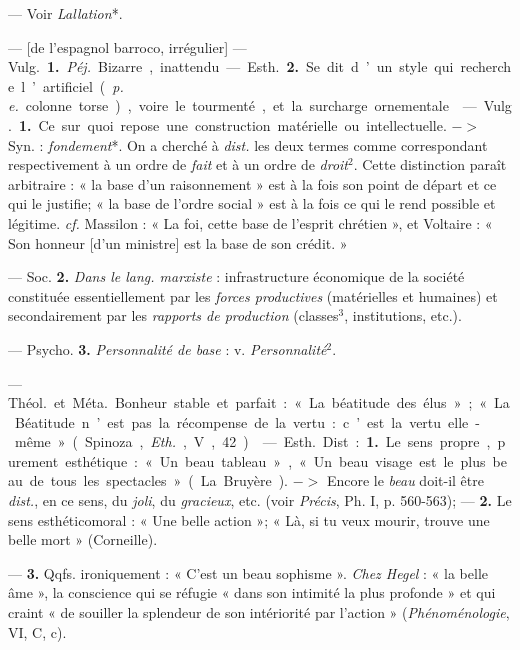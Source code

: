 
	\begin{itemize}[leftmargin=1cm, label=, itemsep=1pt]

 — Voir {\it Lallation}*.

 — [de l'espagnol {\it }barroco, irrégulier] — \si{Vulg.} {\bf 1.} {\it Péj.} Bizarre,
inattendu. — \si{Esth.} {\bf 2.} Se dit d’un
style qui recherche l’artificiel ({\it p. e.}
colonne torse), voire le tourmenté,
et la surcharge ornementale.

 — \si{Vulg.} {\bf 1.} Ce sur quoi repose
une construction matérielle ou intellectuelle. $->$ Syn. : {\it fondement}*. On
a cherché à {\it dist.} les deux termes
comme correspondant respectivement à un ordre de {\it fait} et à un ordre
de {\it droit}$^2$. Cette distinction paraît
arbitraire : « la base d’un raisonnement » est à la fois son point de
départ et ce qui le justifie; « la base
de l’ordre social » est à la fois ce qui
le rend possible et légitime. {\it cf.}  Massilon : « La foi, cette base de l'esprit
chrétien », et Voltaire : « Son honneur [d'un ministre] est la base de
son crédit. »

— Soc. {\bf 2.} {\it Dans le lang. marxiste} :
infrastructure économique de la
société constituée essentiellement
par les {\it forces productives} (matérielles
et humaines) et secondairement par
les {\it rapports de production} (classes$^3$,
institutions, etc.).

— Psycho. {\bf 3.} {\it Personnalité de base} :
v. {\it Personnalité}$^2$.

 — \si{Théol.} et \si{Méta.} Bonheur
stable et parfait : « La béatitude des
élus »; « La Béatitude n’est pas la
récompense de la vertu : c’est la vertu elle-même » (Spinoza, {\it Eth.}, V, 42).

 — \si{Esth.} Dist. : {\bf 1.} Le sens propre,
purement esthétique : « Un beau
tableau », « Un beau visage est le
plus beau de tous les spectacles » (La
Bruyère). $->$ Encore le {\it beau} doit-il
être {\it dist.}, en ce sens, du {\it joli}, du
{\it gracieux}, etc. (voir {\it Précis}, Ph. I,
p. 560-563); — {\bf 2.} Le sens esthéticomoral : « Une belle action »; « Là, si
tu veux mourir, trouve une belle
mort » (Corneille).
 
— {\bf 3.} Qqfs. ironiquement : « C’est
un beau sophisme ». {\it Chez Hegel} :
« la belle âme », la conscience qui se
réfugie « dans son intimité la plus
profonde » et qui craint « de souiller
la splendeur de son intériorité par
l’action » ({\it Phénoménologie}, VI, C, c).


\end{itemize}
